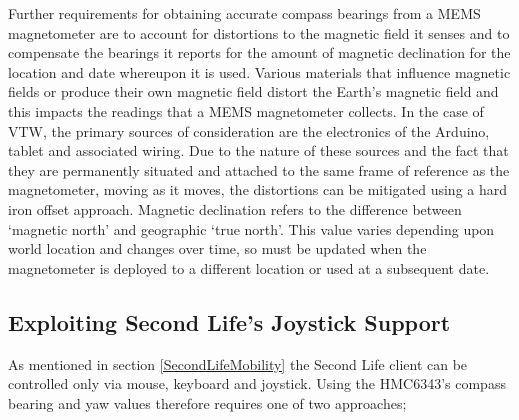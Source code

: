 Further requirements for obtaining accurate compass bearings from a MEMS magnetometer are to account for distortions to the magnetic field it senses and to compensate the bearings it reports for the amount of magnetic declination for the location and date whereupon it is used. Various materials that influence magnetic fields or produce their own magnetic field distort the Earth's magnetic field and this impacts the readings that a MEMS magnetometer collects. In the case of VTW, the primary sources of consideration are the electronics of the Arduino, tablet and associated wiring. Due to the nature of these sources and the fact that they are permanently situated and attached to the same frame of reference as the magnetometer, moving as it moves, the distortions can be mitigated using a hard iron offset approach. Magnetic declination refers to the difference between `magnetic north' and geographic `true north'. This value varies depending upon world location and changes over time, so must be updated when the magnetometer is deployed to a different location or used at a subsequent date.



\subsection{Exploiting Second Life's Joystick Support}

\label{exploitJoystick}

\newcommand{\ArduinoJoystickVideoFootnote}{\footnote{\url{https://www.youtube.com/watch?v=-ddtmqoGNmg}}}

\newcommand{\atmegaFootnote}{\footnote{\url{http://www.atmel.com/devices/ATMEGA16U2.aspx}}}

\newcommand{\atmegaTFootnote}{\footnote{\url{http://www.atmel.com/devices/atmega328.aspx}}}

\newcommand{\arduinousbhidFootnote}{\footnote{\url{http://hunt.net.nz/users/darran/weblog/a3599/}}}

\newcommand{\lufaFootnote}{\footnote{\url{http://www.fourwalledcubicle.com/LUFA.php}}}


As mentioned in section \ref{SecondLifeMobility} the Second Life client can be controlled only via mouse, keyboard and joystick. Using the HMC6343's compass bearing and yaw values therefore requires one of two approaches;

